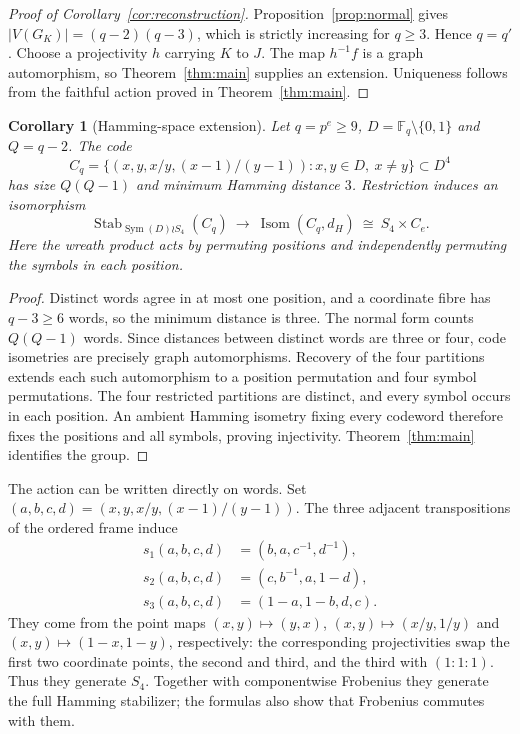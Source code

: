 \documentclass[11pt]{article}
\newtheorem{corollary}[theorem]{Corollary}
\theoremstyle{definition}
\theoremstyle{remark}
\newcommand{\F}{\mathbb F}
\newcommand{\Stab}{\operatorname{Stab}}
\begin{document}
\begin{proof}[Proof of Corollary~\ref{cor:reconstruction}]
Proposition~\ref{prop:normal} gives $|V(G_K)|=(q-2)(q-3)$, which is
strictly increasing for $q\ge3$. Hence $q=q'$. Choose a projectivity
$h$ carrying $K$ to $J$. The map $h^{-1}f$ is a graph automorphism,
so Theorem~\ref{thm:main} supplies an extension.
Uniqueness follows from the faithful action proved in Theorem~\ref{thm:main}.
\end{proof}

\begin{corollary}[Hamming-space extension]\label{cor:code-extension}
Let $q=p^e\ge9$, $D=\F_q\setminus\{0,1\}$ and $Q=q-2$. The code
\[
 C_q=\{(x,y,x/y,(x-1)/(y-1)):x,y\in D,\ x\ne y\}\subset D^4
\]
has size $Q(Q-1)$ and minimum Hamming distance $3$. Restriction induces
an isomorphism
\[
 \Stab_{\operatorname{Sym}(D)\wr S_4}(C_q)
 \ \longrightarrow\ \operatorname{Isom}(C_q,d_H)
 \ \cong\ S_4\times C_e.
\]
Here the wreath product acts by permuting positions and independently
permuting the symbols in each position.
\end{corollary}
\begin{proof}
Distinct words agree in at most one position, and a coordinate fibre has
$q-3\ge6$ words, so the minimum distance is three. The normal form counts
$Q(Q-1)$ words. Since distances between distinct words are three or four,
code isometries are precisely graph automorphisms. Recovery of the four
partitions extends each such automorphism to a position permutation and
four symbol permutations. The four restricted partitions are distinct,
and every symbol occurs in each position. An ambient Hamming isometry
fixing every codeword therefore fixes the positions and all symbols,
proving injectivity. Theorem~\ref{thm:main} identifies the group.
\end{proof}

The action can be written directly on words. Set
$(a,b,c,d)=(x,y,x/y,(x-1)/(y-1))$. The three adjacent transpositions
of the ordered frame induce
\[
\begin{aligned}
 s_1(a,b,c,d)&=(b,a,c^{-1},d^{-1}),\\
 s_2(a,b,c,d)&=(c,b^{-1},a,1-d),\\
 s_3(a,b,c,d)&=(1-a,1-b,d,c).
\end{aligned}
\]
They come from the point maps $(x,y)\mapsto(y,x)$,
$(x,y)\mapsto(x/y,1/y)$ and $(x,y)\mapsto(1-x,1-y)$, respectively:
the corresponding projectivities swap the first two coordinate points,
the second and third, and the third with $(1:1:1)$. Thus they generate
$S_4$. Together with componentwise Frobenius they generate the full
Hamming stabilizer; the formulas also show that Frobenius commutes with them.
\end{document}
